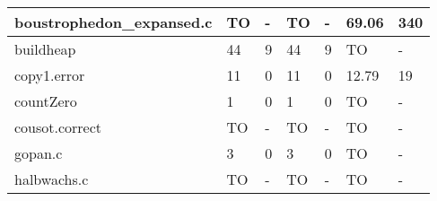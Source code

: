 \begin{table}
{\begin{tabular}{|l|l|l|l|l|l|l|}
    boustrophedon\_expansed.c                                & TO                                    & -                                          & TO                                    & -                                          & 69.06                                                           & 340                                      \\ \hline
    buildheap                                                & 44                                    & 9                                          & 44                                    & 9                                          & TO                                                              & -                                        \\ \hline
    copy1.error                                              & 11                                    & 0                                          & 11                                    & 0                                          & 12.79                                                           & 19                                       \\ \hline
    countZero                                                & 1                                     & 0                                          & 1                                     & 0                                          & TO                                                              & -                                        \\ \hline
    cousot.correct                                           & TO                                    & -                                          & TO                                    & -                                          & TO                                                              & -                                        \\ \hline
    gopan.c                                                  & 3                                     & 0                                          & 3                                     & 0                                          & TO                                                              & -                                        \\ \hline
    halbwachs.c                                              & TO                                    & -                                          & TO                                    & -                                          & TO                                                              & -                                        \\ \hline

\end{tabular}}
\end{table}
